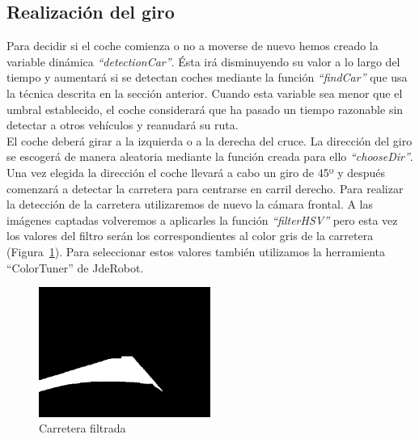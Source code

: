 \subsection{Realización del giro}
Para decidir si el coche comienza o no a moverse de nuevo hemos creado la variable dinámica \textit{``detectionCar''}. Ésta irá disminuyendo su valor a lo largo del tiempo y aumentará si se detectan coches mediante la función \textit{``findCar''} que usa la técnica descrita en la sección anterior. Cuando esta variable sea menor que el umbral establecido, el coche considerará que ha pasado un tiempo razonable sin detectar a otros vehículos y reanudará su ruta. \\

El coche deberá girar a la izquierda o a la derecha del cruce. La dirección del giro se escogerá de manera aleatoria mediante la función creada para ello \textit{``chooseDir''}. Una vez elegida la dirección el coche llevará a cabo un giro de 45º y después comenzará a detectar la carretera para centrarse en carril derecho. Para realizar la detección de la carretera utilizaremos de nuevo la cámara frontal. A las imágenes captadas volveremos a aplicarles la función \textit{``filterHSV''} pero esta vez los valores del filtro serán los correspondientes al color gris de la carretera (Figura~\ref{fig.road}). Para seleccionar estos valores también utilizamos la herramienta ``ColorTuner'' de JdeRobot.\\

\begin{figure}[H]
  \begin{center}
    \includegraphics[width=0.5\textwidth]{figures/Stop/road.jpg}
		\caption{Carretera filtrada}
		\label{fig.road}
		\end{center}
\end{figure}

